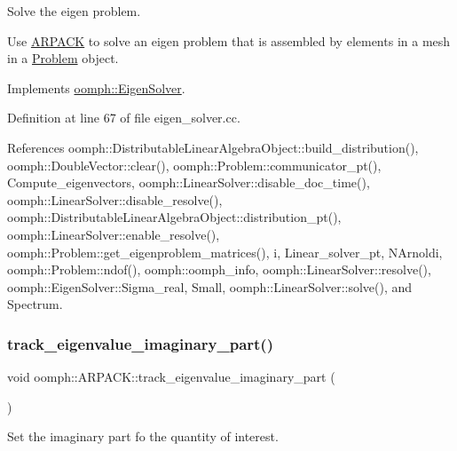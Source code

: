 Solve the eigen problem. 

Use \hyperlink{classoomph_1_1ARPACK}{A\+R\+P\+A\+CK} to solve an eigen problem that is assembled by elements in a mesh in a \hyperlink{classoomph_1_1Problem}{Problem} object. 

Implements \hyperlink{classoomph_1_1EigenSolver_a6a6b09612ce16457b26fa0cfe996fa71}{oomph\+::\+Eigen\+Solver}.



Definition at line 67 of file eigen\+\_\+solver.\+cc.



References oomph\+::\+Distributable\+Linear\+Algebra\+Object\+::build\+\_\+distribution(), oomph\+::\+Double\+Vector\+::clear(), oomph\+::\+Problem\+::communicator\+\_\+pt(), Compute\+\_\+eigenvectors, oomph\+::\+Linear\+Solver\+::disable\+\_\+doc\+\_\+time(), oomph\+::\+Linear\+Solver\+::disable\+\_\+resolve(), oomph\+::\+Distributable\+Linear\+Algebra\+Object\+::distribution\+\_\+pt(), oomph\+::\+Linear\+Solver\+::enable\+\_\+resolve(), oomph\+::\+Problem\+::get\+\_\+eigenproblem\+\_\+matrices(), i, Linear\+\_\+solver\+\_\+pt, N\+Arnoldi, oomph\+::\+Problem\+::ndof(), oomph\+::oomph\+\_\+info, oomph\+::\+Linear\+Solver\+::resolve(), oomph\+::\+Eigen\+Solver\+::\+Sigma\+\_\+real, Small, oomph\+::\+Linear\+Solver\+::solve(), and Spectrum.

\mbox{\label{classoomph_1_1ARPACK_a41e0454599dbf2db541fc66280ea60e3}} 
\subsubsection{\texorpdfstring{track\+\_\+eigenvalue\+\_\+imaginary\+\_\+part()}{track\_eigenvalue\_imaginary\_part()}}
{\footnotesize\ttfamily void oomph\+::\+A\+R\+P\+A\+C\+K\+::track\+\_\+eigenvalue\+\_\+imaginary\+\_\+part (\begin{DoxyParamCaption}{ }\end{DoxyParamCaption})\hspace{0.3cm}{\ttfamily [inline]}}



Set the imaginary part fo the quantity of interest. 



